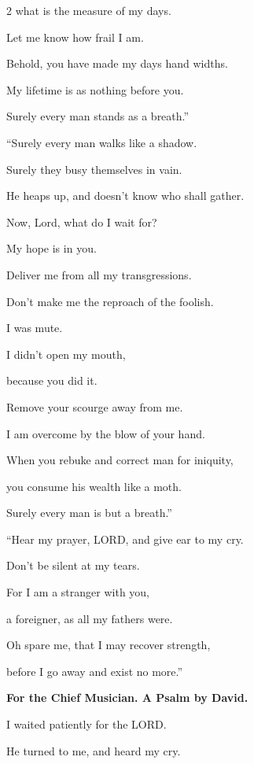 \begin{multicols}{2}
	what is the measure of my days.
	
	Let me know how frail I am.
	
	
	\myverse{}Behold, you have made my days hand widths.
	
	My lifetime is as nothing before you.
	
	Surely every man stands as a breath.”
	
	\vspace{\baselineskip}
	
	
	\myverse{}“Surely every man walks like a shadow.
	
	Surely they busy themselves in vain.
	
	He heaps up, and doesn’t know who shall gather.
	
	
	\myverse{}Now, Lord, what do I wait for?
	
	My hope is in you.
	
	
	\myverse{}Deliver me from all my transgressions.
	
	Don’t make me the reproach of the foolish.
	
	
	\myverse{}I was mute.
	
	I didn’t open my mouth,
	
	because you did it.
	
	
	\myverse{}Remove your scourge away from me.
	
	I am overcome by the blow of your hand.
	
	
	\myverse{}When you rebuke and correct man for iniquity,
	
	you consume his wealth like a moth.
	
	Surely every man is but a breath.”
	
	\vspace{\baselineskip}
	
	\myverse{}“Hear my prayer, LORD, and give ear to my cry.
	
	Don’t be silent at my tears.
	
	For I am a stranger with you,
	
	a foreigner, as all my fathers were.
	
	
	\myverse{}Oh spare me, that I may recover strength,
	
	before I go away and exist no more.”
	
	
	\mychapter{}\textbf{For the Chief Musician. A Psalm by David.}
	
	\quad \myverse*{}I waited patiently for the LORD.
	
	He turned to me, and heard my cry.
	

\end{multicols}
